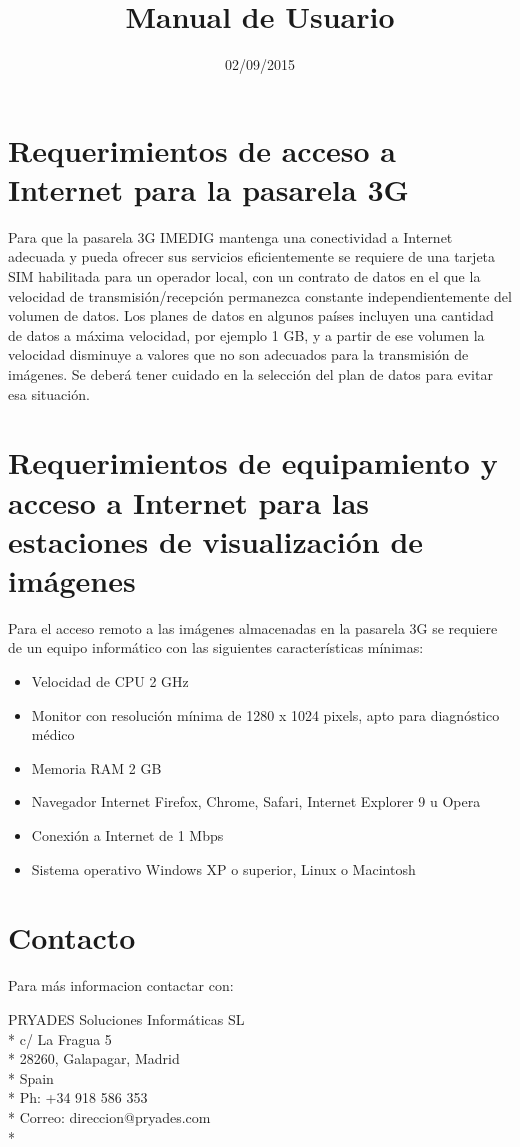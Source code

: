 \documentclass{plantilla-manual-usuario}
\title{Manual de Usuario}
\date{02/09/2015}
\begin{document}
\frontmatter

\maketitle

\newpage

\mainmatter

\section{Requerimientos de acceso a Internet para la pasarela 3G}

Para que la pasarela 3G IMEDIG mantenga una conectividad a Internet adecuada y pueda ofrecer sus servicios eficientemente se requiere de una tarjeta SIM habilitada para un operador local, con un contrato de datos en el que la velocidad de transmisión/recepción permanezca constante independientemente del volumen de datos. Los planes de datos en algunos países incluyen una cantidad de datos a máxima velocidad, por ejemplo 1 GB, y a partir de ese volumen la velocidad disminuye a valores que no son adecuados para la transmisión de imágenes. Se deberá tener cuidado en la selección del plan de datos para evitar esa situación.  

\section{Requerimientos de equipamiento y acceso a Internet para las estaciones de visualización de imágenes}

Para el acceso remoto a las imágenes almacenadas en la pasarela 3G se requiere de un equipo informático con las siguientes características mínimas:

\begin{itemize}
\item Velocidad de CPU 2 GHz
\item Monitor con resolución mínima de 1280 x 1024 pixels, apto para diagnóstico médico
\item Memoria RAM 2 GB
\item Navegador Internet Firefox, Chrome, Safari, Internet Explorer 9 u Opera
\item Conexión a Internet de 1 Mbps
\item Sistema operativo Windows XP o superior, Linux o Macintosh
\end{itemize}

\section{Contacto}

Para más informacion contactar con:

PRYADES Soluciones Informáticas SL\\*
c/ La Fragua 5\\*
28260, Galapagar, Madrid\\*
Spain\\*
Ph: +34 918 586 353\\*
Correo: direccion@pryades.com\\*
\end{document}
